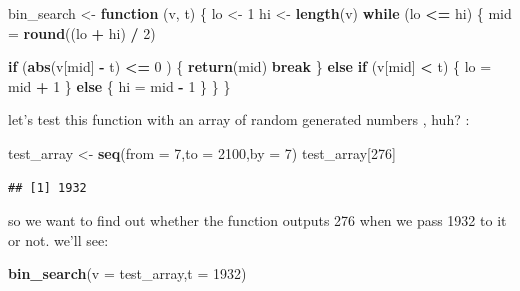 \documentclass[]{article}
\newenvironment{Shaded}{\begin{snugshade}}{\end{snugshade}}
\newcommand{\KeywordTok}[1]{\textcolor[rgb]{0.13,0.29,0.53}{\textbf{#1}}}
\newcommand{\DataTypeTok}[1]{\textcolor[rgb]{0.13,0.29,0.53}{#1}}
\newcommand{\DecValTok}[1]{\textcolor[rgb]{0.00,0.00,0.81}{#1}}
\newcommand{\StringTok}[1]{\textcolor[rgb]{0.31,0.60,0.02}{#1}}
\newcommand{\ControlFlowTok}[1]{\textcolor[rgb]{0.13,0.29,0.53}{\textbf{#1}}}
\newcommand{\OperatorTok}[1]{\textcolor[rgb]{0.81,0.36,0.00}{\textbf{#1}}}
\newcommand{\NormalTok}[1]{#1}
\begin{document}
\begin{Shaded}
\begin{Highlighting}[]
\NormalTok{bin_search <-}\StringTok{ }\ControlFlowTok{function}\NormalTok{ (v, t) \{}
\NormalTok{      lo <-}\StringTok{ }\DecValTok{1}
\NormalTok{      hi <-}\StringTok{ }\KeywordTok{length}\NormalTok{(v)}
      \ControlFlowTok{while}\NormalTok{ (lo }\OperatorTok{<=}\StringTok{ }\NormalTok{hi) \{}
\NormalTok{            mid =}\StringTok{ }\KeywordTok{round}\NormalTok{((lo }\OperatorTok{+}\StringTok{ }\NormalTok{hi) }\OperatorTok{/}\StringTok{ }\DecValTok{2}\NormalTok{)}
            
            \ControlFlowTok{if}\NormalTok{ (}\KeywordTok{abs}\NormalTok{(v[mid] }\OperatorTok{-}\StringTok{ }\NormalTok{t) }\OperatorTok{<=}\StringTok{ }\DecValTok{0}\NormalTok{ ) \{}
                  \KeywordTok{return}\NormalTok{(mid)}
                  \ControlFlowTok{break}
\NormalTok{            \} }\ControlFlowTok{else} \ControlFlowTok{if}\NormalTok{ (v[mid] }\OperatorTok{<}\StringTok{ }\NormalTok{t) \{}
\NormalTok{                  lo =}\StringTok{ }\NormalTok{mid }\OperatorTok{+}\StringTok{ }\DecValTok{1}
\NormalTok{            \} }\ControlFlowTok{else}\NormalTok{ \{}
\NormalTok{                  hi =}\StringTok{ }\NormalTok{mid }\OperatorTok{-}\StringTok{ }\DecValTok{1}
\NormalTok{            \}}
\NormalTok{      \}}
\NormalTok{\}}
\end{Highlighting}
\end{Shaded}

let's test this function with an array of random generated numbers ,
huh? :

\begin{Shaded}
\begin{Highlighting}[]
\NormalTok{test_array <-}\StringTok{ }\KeywordTok{seq}\NormalTok{(}\DataTypeTok{from =} \DecValTok{7}\NormalTok{,}\DataTypeTok{to =} \DecValTok{2100}\NormalTok{,}\DataTypeTok{by =} \DecValTok{7}\NormalTok{)}
\NormalTok{test_array[}\DecValTok{276}\NormalTok{]}
\end{Highlighting}
\end{Shaded}

\begin{verbatim}
## [1] 1932
\end{verbatim}

so we want to find out whether the function outputs 276 when we pass
1932 to it or not. we'll see:

\begin{Shaded}
\begin{Highlighting}[]
\KeywordTok{bin_search}\NormalTok{(}\DataTypeTok{v =}\NormalTok{ test_array,}\DataTypeTok{t =} \DecValTok{1932}\NormalTok{)}
\end{Highlighting}
\end{Shaded}
\end{document}
